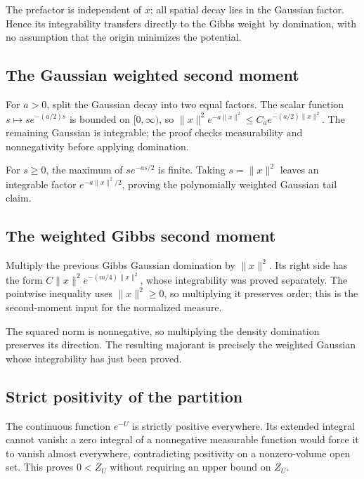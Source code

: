 \documentclass[11pt,a4paper]{article}
\begin{document}
The prefactor is independent of \(x\); all spatial decay lies in the Gaussian factor. Hence its integrability transfers directly to the Gibbs weight by domination, with no assumption that the origin minimizes the potential.


\subsection{\texorpdfstring{The Gaussian weighted second moment}{The Gaussian weighted second moment}}


For \(a>0\), split the Gaussian decay into two equal factors. The scalar function \(s\mapsto s e^{-(a/2)s}\) is bounded on \([0,\infty)\), so \(\|x\|^2e^{-a\|x\|^2}\le C_a e^{-(a/2)\|x\|^2}\). The remaining Gaussian is integrable; the proof checks measurability and nonnegativity before applying domination.



For \(s\ge0\), the maximum of \(s e^{-as/2}\) is finite. Taking \(s=\|x\|^2\) leaves an integrable factor \(e^{-a\|x\|^2/2}\), proving the polynomially weighted Gaussian tail claim.


\subsection{\texorpdfstring{The weighted Gibbs second moment}{The weighted Gibbs second moment}}


Multiply the previous Gibbs Gaussian domination by \(\|x\|^2\). Its right side has the form \(C\|x\|^2e^{-(m/4)\|x\|^2}\), whose integrability was proved separately. The pointwise inequality uses \(\|x\|^2\ge0\), so multiplying it preserves order; this is the second-moment input for the normalized measure.



The squared norm is nonnegative, so multiplying the density domination preserves its direction. The resulting majorant is precisely the weighted Gaussian whose integrability has just been proved.


\subsection{\texorpdfstring{Strict positivity of the partition}{Strict positivity of the partition}}


The continuous function \(e^{-U}\) is strictly positive everywhere. Its extended integral cannot vanish: a zero integral of a nonnegative measurable function would force it to vanish almost everywhere, contradicting positivity on a nonzero-volume open set. This proves \(0<Z_U\) without requiring an upper bound on \(Z_U\).
\end{document}
